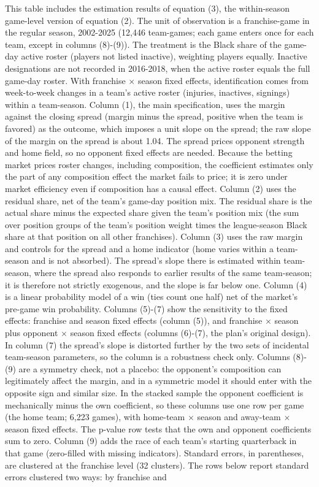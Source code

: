 \begin{table}[!h]
{\begin{threeparttable}
\begin{tablenotes}[para]
\item This table includes the estimation results of equation (3), the within-season game-level version of equation (2). The unit of observation is a franchise-game in the regular season, 2002-2025 (12,446 team-games; each game enters once for each team, except in columns (8)-(9)). The treatment is the Black share of the game-day active roster (players not listed inactive), weighting players equally. Inactive designations are not recorded in 2016-2018, when the active roster equals the full game-day roster. With franchise $\times$ season fixed effects, identification comes from week-to-week changes in a team's active roster (injuries, inactives, signings) within a team-season. Column (1), the main specification, uses the margin against the closing spread (margin minus the spread, positive when the team is favored) as the outcome, which imposes a unit slope on the spread; the raw slope of the margin on the spread is about 1.04. The spread prices opponent strength and home field, so no opponent fixed effects are needed. Because the betting market prices roster changes, including composition, the coefficient estimates only the part of any composition effect the market fails to price; it is zero under market efficiency even if composition has a causal effect. Column (2) uses the residual share, net of the team's game-day position mix. The residual share is the actual share minus the expected share given the team's position mix (the sum over position groups of the team's position weight times the league-season Black share at that position on all other franchises). Column (3) uses the raw margin and controls for the spread and a home indicator (home varies within a team-season and is not absorbed). The spread's slope there is estimated within team-season, where the spread also responds to earlier results of the same team-season; it is therefore not strictly exogenous, and the slope is far below one. Column (4) is a linear probability model of a win (ties count one half) net of the market's pre-game win probability. Columns (5)-(7) show the sensitivity to the fixed effects: franchise and season fixed effects (column (5)), and franchise $\times$ season plus opponent $\times$ season fixed effects (columns (6)-(7), the plan's original design). In column (7) the spread's slope is distorted further by the two sets of incidental team-season parameters, so the column is a robustness check only. Columns (8)-(9) are a symmetry check, not a placebo: the opponent's composition can legitimately affect the margin, and in a symmetric model it should enter with the opposite sign and similar size. In the stacked sample the opponent coefficient is mechanically minus the own coefficient, so these columns use one row per game (the home team; 6,223 games), with  home-team $\times$ season and away-team $\times$ season fixed effects. The p-value row tests that the own and opponent coefficients sum to zero. Column (9) adds the race of each team's starting quarterback in that game (zero-filled with missing indicators). Standard errors, in parentheses, are clustered at the franchise level (32 clusters). The rows below report standard errors clustered two ways: by franchise and 
\end{tablenotes}
\end{threeparttable}}
\end{table}
